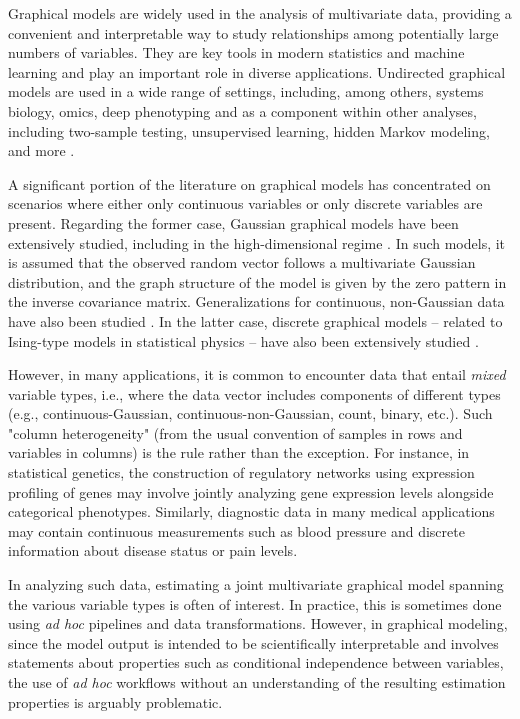 Graphical models are widely used in the analysis of multivariate data, providing a convenient and interpretable way to study relationships among potentially large numbers of variables. They are key tools in modern statistics and machine learning and play an important role in diverse applications. Undirected graphical models are used in a wide range of settings, including, among others, systems biology, omics, deep phenotyping \cite[see, e.g.][]{dobra2004, Finegold11, monti2014}
and as a component within other analyses, including two-sample testing, unsupervised learning, hidden Markov modeling, and more \cite[examples include][]{wei2007,verzelen2009,stadler2013, stadler2015,perrakis2021}.

A significant portion of the literature on graphical models has concentrated on scenarios where either only continuous variables or only discrete variables are present. Regarding the former case, Gaussian graphical models have been extensively studied, including in the high-dimensional regime \cite[see among others][]{Meinshausen06, Friedman08, Banerjee08, Lam09, Yuan10, Ravikumar11, Cai11}. In such models, it is assumed that the observed random vector follows a multivariate Gaussian distribution, and the graph structure of the model is given by the zero pattern in the inverse covariance matrix. Generalizations for continuous, non-Gaussian data have also been studied \cite{Miyamura06, Liu09, Finegold11}. In the latter case, discrete graphical models -- related to Ising-type models in statistical physics -- have also been extensively studied \cite[see, e.g.][]{wainwright2006, ravikumar2010}.

However, in many applications, it is common to encounter data that entail \textit{mixed} variable types, i.e., where the data vector includes components of different types (e.g., continuous-Gaussian, continuous-non-Gaussian, count, binary, etc.). Such "column heterogeneity" (from the usual convention of samples in rows and variables in columns) is the rule rather than the exception. For instance, in statistical genetics, the construction of regulatory networks using expression profiling of genes may involve jointly analyzing gene expression levels alongside categorical phenotypes. Similarly, diagnostic data in many medical applications may contain continuous measurements such as blood pressure and discrete information about disease status or pain levels.

In analyzing such data, estimating a joint multivariate graphical model spanning the various variable types is often of interest. In practice, this is sometimes done using \textit{ad hoc} pipelines and data transformations. However, in graphical modeling, since the model output is intended to be scientifically interpretable and involves statements about properties such as conditional independence between variables, the use of \textit{ad hoc} workflows without an understanding of the resulting estimation properties is arguably problematic.

